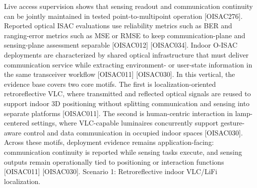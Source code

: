 \markdownRendererUlItem Live access supervision shows that sensing readout and communication continuity can be jointly maintained in tested point-to-multipoint operation [O\markdownRendererUnderscore{}ISAC\markdownRendererUnderscore{}276].\markdownRendererUlItemEnd 
\markdownRendererUlItem Reported optical ISAC evaluations use reliability metrics such as BER and ranging-error metrics such as MSE or RMSE to keep communication-plane and sensing-plane assessment separable [O\markdownRendererUnderscore{}ISAC\markdownRendererUnderscore{}012] [O\markdownRendererUnderscore{}ISAC\markdownRendererUnderscore{}034].\markdownRendererUlItemEnd 
\markdownRendererUlEndTight \markdownRendererInterblockSeparator
{}
\markdownRendererSectionEnd 
\markdownRendererSectionEnd \markdownRendererSectionBegin
{}\markdownRendererInterblockSeparator
{}\markdownRendererSectionBegin
{}\markdownRendererInterblockSeparator
{}Indoor O-ISAC deployments are characterized by shared optical infrastructure that must deliver communication service while extracting environment- or user-state information in the same transceiver workflow [O\markdownRendererUnderscore{}ISAC\markdownRendererUnderscore{}011] [O\markdownRendererUnderscore{}ISAC\markdownRendererUnderscore{}030]. In this vertical, the evidence base covers two core motifs. The first is localization-oriented retroreflective VLC, where transmitted and reflected optical signals are reused to support indoor 3D positioning without splitting communication and sensing into separate platforms [O\markdownRendererUnderscore{}ISAC\markdownRendererUnderscore{}011]. The second is human-centric interaction in lamp-centered settings, where VLC-capable luminaires concurrently support gesture-aware control and data communication in occupied indoor spaces [O\markdownRendererUnderscore{}ISAC\markdownRendererUnderscore{}030]. Across these motifs, deployment evidence remains application-facing: communication continuity is reported while sensing tasks execute, and sensing outputs remain operationally tied to positioning or interaction functions [O\markdownRendererUnderscore{}ISAC\markdownRendererUnderscore{}011] [O\markdownRendererUnderscore{}ISAC\markdownRendererUnderscore{}030].\markdownRendererInterblockSeparator
{}
\markdownRendererSectionEnd \markdownRendererSectionBegin
{}\markdownRendererInterblockSeparator
{}Scenario 1: Retroreflective indoor VLC/LiFi localization.\markdownRendererHardLineBreak
